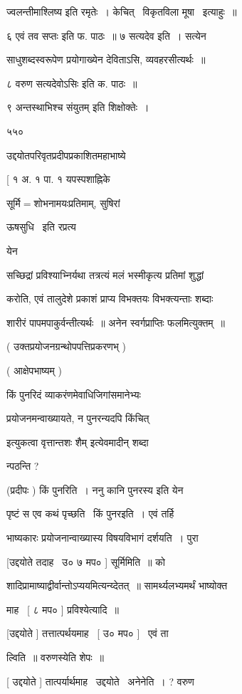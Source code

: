 \documentclass[11pt, openany]{book}
\begin{document}
{\qt ज्वलन्तीमाश्लिष्य} इति रमृतेः~। केचित् \textendash\ विकृतविला मूषा \textendash\ इत्याहुः~॥ 

६ {\qt एवं तव सप्तः इति फ. पाठः~॥} ७ सत्यदेव इति~। सत्येन 

साधुशब्दस्वरूपेण प्रयोगाख्येन देविताऽसि, व्यवहरसीत्यर्थः~॥ 

८ {\qt वरुण सत्यदेवोऽसिः} इति क. पाठः~॥ 

९ {\qt अन्तस्थाभिश्च संयुतम्} इति शिक्षोक्तेः~। 

५५० 

उद्दयोतपरिवृतप्रदीपप्रकाशितमहाभाष्ये \textendash\ 

[ १ अ. १ पा. १ यपस्पशाह्निके 

सूर्मि$=$शोभनामयःप्रतिमाम्, सुषिरां \textendash\ {\qt ऊषसुधि \textendash\ इति रप्रत्य \textendash\ 

येन} सच्छिद्रां प्रविश्याभ्निर्यथा तत्रत्यं मलं भस्मीकृत्य प्रतिमां
शुद्धां 

करोति, एवं तालुदेशे प्रकाशं प्राप्य विभक्तयः विभक्त्यन्ताः शब्दाः 

शारीरं पापमपाकुर्वन्तीत्यर्थः~॥ अनेन स्वर्गप्राप्तिः फलमित्युक्तम्~॥


( उक्तप्रयोजनग्रन्थोपपत्तिप्रकरणभ् ) 

( आक्षेपभाष्यम् ) 

किं पुनरिदं व्याकरंणमेवाधिजिगांसमानेभ्यः 

प्रयोजनमन्वाख्यायते, न पुनरन्यदपि किंचित् 

इत्युकत्वा वृत्तान्तशः {\qt शैम्} इत्येवमादीन् शब्दा \textendash\ 

न्पठन्ति ? 

(प्रदीपः ) किं पुनरिति~। ननु {\qt कानि पुनरस्य} इति येन 

पृष्टं स एव कथं पृच्छति \textendash\ {\qt किं पुनरइति~।} एवं तर्हि 

भाष्यकारः प्रयोजनान्वाख्यास्य विषयविभागं दर्शयति~। पुरा 

[उद्दयोते तदाह \textendash\ उ० ७ मप० ] सूर्मिमिति~॥ को \textendash\ 

शादिप्रामाष्याद्वीर्वान्तोऽप्ययमित्यन्य्देतत्~॥ सामर्थ्यलभ्यमर्थं
भाष्योक्त \textendash\ 

माह \textendash\ [ ८ मप० ] प्रविश्येत्यादि~॥ 

[उद्दयोते ] तत्तात्पर्थयमाह \textendash\ [ उ० मप० ] \textendash\ एवं ता \textendash\ 

ल्विति~॥ वरुणस्येति शेपः~॥ 

[ उद्दयोते ] तात्पर्यार्थमाह \textendash\ उद्दयोते \textendash\ अनेनेति~। ? वरुण \textendash\ 
\end{document}
